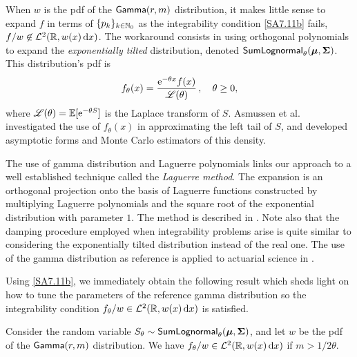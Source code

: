 When $w$ is the pdf of the $\mathsf{Gamma}(r,m)$ distribution, it makes little sense to expand $f$ in terms of $\{p_{k}\}_{k\in\mathbb{N}_0}$ as the integrability condition \eqref{SA7.11b} fails, $f/w \not\in\mathcal{L}^2(\mathbb{R}, w(x) \mathop{}\!\mathrm{d} x)$. The workaround consists in using orthogonal polynomials to expand the \emph{exponentially tilted} distribution, denoted $\mathsf{SumLognormal}_\theta(\bm{\mu}, \bm{\Sigma})$. This distribution's pdf is
\begin{equation}\label{ExponentiallyTiltedPDF}
f_\theta(x) = \frac{\mathrm{e}^{-\theta x}f(x)}{\mathscr{L}(\theta)} \,,\quad \theta \ge 0,
\end{equation}
where $\mathscr{L}(\theta)=\operatorname{{\mathbb E}}[\mathrm{e}^{-\theta S}]$ is the Laplace transform of $S$. Asmussen et al.\ \cite{asmussen2015exponential} investigated the use of $f_\theta(x)$ in approximating the left tail of $S$, and developed asymptotic forms and Monte Carlo estimators of this density.
\begin{remark}
The use of gamma distribution and Laguerre polynomials links our approach to a well established technique called the \emph{Laguerre method}. The expansion is an orthogonal projection onto the basis of Laguerre functions constructed by multiplying Laguerre polynomials and the square root of the exponential distribution with parameter $1$. The method is described in \cite{Abate1995}. Note also that the damping procedure employed when integrability problems arise is quite similar to considering the exponentially tilted distribution instead of the real one. The use of the gamma distribution as reference is applied to actuarial science in \cite{GoLoPo16,GoLoPo15}.
\remQED
\end{remark}
Using \eqref{SA7.11b}, we immediately obtain the following result which
sheds light on how to tune the parameters of the reference gamma distribution so the integrability condition $f_\theta / w \in\mathcal{L}^2(\mathbb{R}, w(x) \mathop{}\!\mathrm{d} x)$ is satisfied.
\begin{proposition}\label{pr:IntegrabiltyConditionWRTGammaDistribution}
Consider the random variable $S_\theta \sim \mathsf{SumLognormal}_\theta(\bm{\mu},\bm{\Sigma})$, and let $w$ be the pdf of the $\mathsf{Gamma}(r,m)$ distribution. We have $f_\theta/w \in\mathcal{L}^2(\mathbb{R}, w(x) \mathop{}\!\mathrm{d} x)$ if
$m>1/2\theta$.
\end{proposition}

